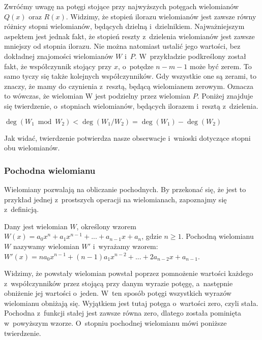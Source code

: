 Zwróćmy uwagę na potęgi stojące przy najwyższych potęgach wielomianów $Q(x)$ oraz $R(x)$. Widzimy, że stopień ilorazu wielomianów jest zawsze równy różnicy stopni wielomianów, będących dzielną i~dzielnikiem. Najważniejszym aspektem jest jednak fakt, że stopień reszty z~dzielenia wielomianów jest zawsze mniejszy od stopnia ilorazu. Nie można natomiast ustalić jego wartości, bez dokładnej znajomości wielomianów $W$ i~$P$. W~przykładzie podkreślony został fakt, że współczynnik stojący przy $x$, o~potędze $n-m-1$ może być zerem. To samo tyczy się także kolejnych współczynników. Gdy wszystkie one są zerami, to znaczy, że mamy do czynienia z~resztą, będącą wielomianem zerowym. Oznacza to wówczas, że wielomian W jest podzielny przez wielomian $P$. Poniżej znajduje się twierdzenie, o~stopniach wielomianów, będących ilorazem i~resztą z~dzielenia.

\begin{theorem}
	$ $\\
	$\deg(W_1 \bmod W_2) < \deg(W_1 / W_2) = \deg(W_1) - \deg(W_2)$
\end{theorem}

Jak widać, twierdzenie potwierdza nasze obserwacje i~wnioski dotyczące stopni obu wielomianów.

\subsubsection{Pochodna wielomianu}

Wielomiany pozwalają na obliczanie pochodnych. By przekonać się, że jest to przykład jednej z~prostszych operacji na wielomianach, zapoznajmy się z~definicją.

\begin{definition}
	$ $\\
	Dany jest wielomian $W$, określony wzorem $W(x) = a_0x^n + a_1x^{n-1} + ... + a_{n-1}x + a_n$, gdzie $n\ge1$. Pochodną wielomianu $W$ nazywamy wielomian $W'$ i~wyrażamy wzorem:
	$W'(x) = na_0x^{n-1} + (n-1) a_1x^{n-2} + ... + 2a_{n-2}x + a_{n-1}$.
\end{definition}

Widzimy, że powstały wielomian powstał poprzez pomnożenie wartości każdego z~współczynników przez stojącą przy danym wyrazie potęgę, a~następnie obniżenie jej wartości o~jeden. W~ten sposób potęgi wszystkich wyrazów wielomianu obniżają się. Wyjątkiem jest tutaj potęga o~wartości zero, czyli stała. Pochodna z~funkcji stałej jest zawsze równa zero, dlatego została pominięta w~powyższym wzorze. O~stopniu pochodnej wielomianu mówi poniższe twierdzenie.

